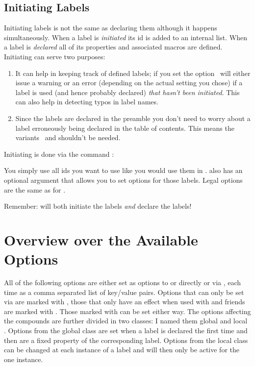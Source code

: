 \documentclass[load-preamble+,ngerman,british,american]{cnltx-doc}
\begin{document}
\subsection{Initiating Labels}\label{sec:initiating-labels}
Initiating labels is not the same as declaring them although it happens
simultaneously.  When a label is \emph{initiated} its \ac{id} is added to an
internal list.  When a label is \emph{declared} all of its properties and
associated macros are defined.  Initiating can serve two purposes:
\begin{enumerate}
  \item It can help in keeping track of defined labels; if you set the option
     \chemnum\ will either issue a warning or an error (depending 
    on the actual setting you chose) if a label is used (and hence probably
    declared) \emph{that hasn't been initiated}.  This can also help in
    detecting typos in label names.
  \item Since the labels are declared in the preamble you don't need to worry
    about a label erroneously being declared in the table of contents.  This
    means the variants \sarg\ and \code{+} shouldn't be
    needed.
\end{enumerate}

Initiating is done via the command :
\begin{sourcecode}
\end{sourcecode}
You simply use all \acp{id} you want to use like you would use them in
.   also has an optional argument that allows you to set
options for those labels.  Legal options are the same as for .

Remember:  will both initiate the labels \emph{and} declare the
labels!

\section{Overview over the Available Options}\label{sec:overv-over-avail-1}
All of the following options are either
set as options to  or  directly or via
, each time as a comma separated list of
key/value pairs.  Options that can only be set via  are marked
with , those that only have an effect when used with  and
friends are marked with .  Those marked with  can
be set either way.  The options affecting the compounds are further divided in
two classes: I named them global  and local . Options
from the global class are set when a label is declared the first time and then
are a fixed property of the corresponding label.  Options from the local class
can be changed at each instance of a label and will then only be active for
the one instance.
\end{document}
